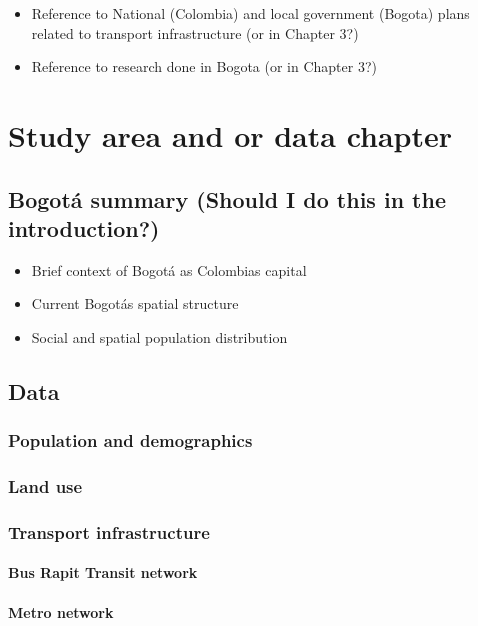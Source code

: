 \documentclass[12pt, a4paper]{report}
\begin{document}
\begin{itemize}
  \item Reference to National (Colombia) and local government (Bogota) plans related to transport infrastructure (or in Chapter 3?)
  \item Reference to research done in Bogota (or in Chapter 3?)
\end{itemize}

\chapter{Study area and or data chapter} \label{Chap3}

\section{Bogot\'{a} summary (Should I do this in the introduction?)}

\begin{itemize}
  \item Brief context of Bogot\'{a} as Colombia\textquotesingle s capital
  \item Current Bogot\'{a}\textquotesingle s spatial structure
  \item Social and spatial population distribution
\end{itemize}

\section{Data}

\subsection{Population and demographics}

\subsection{Land use}

\subsection{Transport infrastructure}

\subsubsection{Bus Rapit Transit network}

\subsubsection{Metro network}
\end{document}
